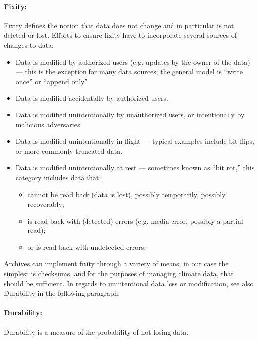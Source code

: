 \paragraph{Fixity:}
Fixity defines the notion that data does not change and in particular is not deleted or lost.
Efforts to ensure fixity have to incorporate several sources of changes to data:
\begin{itemize}
	\item Data is modified by authorized users (e.g. updates by the owner of the data) --- this is the exception for many data sources; the general model is ``write once'' or ``append only''
	\item Data is modified accidentally by authorized users.
	\item Data is modified unintentionally by unauthorized users, or intentionally by malicious adversaries.
	\item Data is modified unintentionally in flight --- typical examples include bit flips, or more commonly truncated data.
	\item Data is modified unintentionally at rest --- sometimes known as ``bit rot,'' this category includes data that:
  \begin{itemize}
	  \item cannot be read back (data is lost), possibly temporarily, possibly recoverably;
	  \item is read back with (detected) errors (e.g. media error, possibly a partial read);
	  \item or is read back with undetected errors.
  \end{itemize}
\end{itemize}
Archives can implement fixity through a variety of means; in our case the simplest is checksums, and for
the purposes of managing climate data, that should be sufficient.
In regards to unintentional data loss or modification, see also Durability in the following paragraph.

\paragraph{Durability:}

Durability is a measure of the probability of not losing data.


